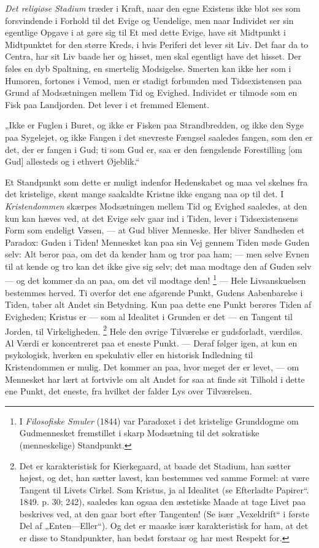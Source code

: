 \documentclass[12pt,a4paper,openany]{book}
\newcommand{\opage}[1]{\marginnote{\footnotesize\textit{[#1]}}}
\begin{document}
\textit{Det religiøse Stadium} træder i Kraft, naar den egne Existens ikke blot
ses som forsvindende i Forhold til det Evige og Uendelige, men naar Individet
ser sin egentlige Opgave i at gøre sig til Et med dette Evige, have sit
Midtpunkt i Midtpunktet for den større Kreds, i hvis Periferi det lever sit
Liv. Det faar da to Centra, har sit Liv baade her og hisset, men skal egentligt
have det hisset. Der føles en dyb Spaltning, en smertelig Modsigelse. Smerten
kan ikke her som i Humoren, fortones i Vemod, men er stadigt forbunden med
Tidsexistensen paa Grund af Modsætningen mellem Tid og Evighed. Individet er
tilmode som en Fisk paa Landjorden. Det lever i et fremmed Element.

„Ikke er Fuglen i Buret, og ikke er Fisken paa Strandbredden, og ikke den Syge
paa Sygelejet, og ikke Fangen i det
\setcounter{footnote}{0}%
\opage{162}snevreste Fængsel saaledes fangen, som den er det, der er fangen i
Gud; ti som Gud er, saa er den fængslende Forestilling [om Gud] allesteds og i
ethvert Øjeblik.“

Et Standpunkt som dette er muligt indenfor Hedenskabet og maa vel skelnes fra
det kristelige, skønt mange saakaldte Kristne ikke engang naa op til det. I
\textit{Kristendommen} skærpes Modsætningen mellem Tid og Evighed saaledes, at
den kun kan hæves ved, at det Evige selv gaar ind i Tiden, lever i
Tidsexistensens Form som endeligt Væsen, --- at Gud bliver Menneske. Her bliver
Sandheden et Paradox: Guden i Tiden! Mennesket kan paa sin Vej gennem Tiden
møde Guden selv: Alt beror paa, om det da kender ham og tror paa ham; --- men
selve Evnen til at kende og tro kan det ikke give sig selv; det maa modtage den
af Guden selv --- og det kommer da an paa, om det vil modtage den!%
\footnote[1]{I \textit{Filosofiske Smuler} (1844) var Paradoxet i det
kristelige Grunddogme om Gudmennesket fremstillet i skarp Modsætning til det
sokratiske (menneskelige) Standpunkt.} --- Hele Livsanskuelsen bestemmes
herved. Ti overfor det ene afgørende Punkt, Gudens Aabenbarelse i Tiden, taber
alt Andet sin Betydning. Kun paa dette ene Punkt berøres Tiden af Evigheden;
Kristus er --- som al Idealitet i Grunden er det --- en Tangent til Jorden, til
Virkeligheden.%
\footnote[2]{Det er karakteristisk for Kierkegaard, at baade det Stadium, han
sætter højest, og det, han sætter lavest, kan bestemmes ved samme Formel: at
være Tangent til Livets Cirkel. Som Kristus, ja al Idealitet (se Efterladte
Papirer“. 1849. p. 30; 242), saaledes kan ogsaa den æstetiske Maade at tage
Livet paa beskrives ved, at den gaar bort efter Tangenten! (Se især
„Vexeldrift“ i første Del af „Enten---Eller“). Og det er maaske især
karakteristisk for ham, at det er disse to Standpunkter, han bedst forstaar og
har mest Respekt for.} Hele den øvrige Tilværelse er gudsforladt, værdiløs. Al
Værdi er koncentreret paa et eneste Punkt. --- Deraf følger igen, at kun en
psykologisk, hverken en spekulativ eller en historisk Indledning til
Kristendommen er mulig. Det kommer an paa, hvor meget der er levet, --- om
Mennesket har lært at fortvivle om alt Andet for saa at finde sit Tilhold i
dette ene Punkt, det eneste, fra hvilket der falder Lys over Tilværelsen.
\end{document}
